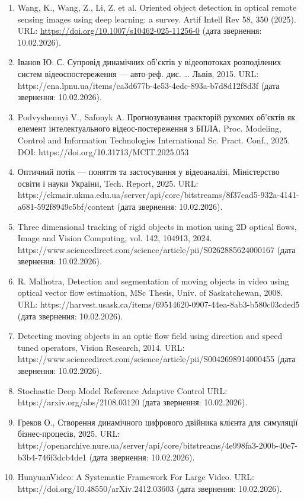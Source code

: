 \documentclass[
]{article}
\begin{document}
\begin{enumerate}
\item
  Wang, K., Wang, Z., Li, Z. et al. Oriented object detection in optical remote sensing images using deep learning: a survey. Artif Intell Rev 58, 350 (2025). URL: \url{https://doi.org/10.1007/s10462-025-11256-0} (дата звернення: 10.02.2026).
\item
  Іванов Ю. С. Супровід динамічних об'єктів у відеопотоках розподілених систем відеоспостереження --- авто-реф. дис. \ldots{} Львів, 2015. URL: https://ena.lpnu.ua/items/ca3d677b-4e53-4edc-893a-b7d8d12f8d3f (дата звернення: 10.02.2026).
\item
  Podvyshennyi V., Safonyk A. Прогнозування траєкторій рухомих об'єктів як елемент інтелектуального відеос-постереження з БПЛА. Proc. Modeling, Control and Information Technologies International Sc. Pract. Conf., 2025. DOI: https://doi.org/10.31713/MCIT.2025.053
\item
  Оптичний потік --- поняття та застосування у відеоаналізі, Міністерство освіти і науки України, Tech. Report, 2025. URL: https://ekmair.ukma.edu.ua/server/api/core/bitstreams/8f37cad5-932a-4141-a681-592f8949c5bf/content (дата звернення: 10.02.2026).
\item
  Three dimensional tracking of rigid objects in motion using 2D optical flows, Image and Vision Computing, vol. 142, 104913, 2024. https://www.sciencedirect.com/science/article/pii/S0262885624000167 (дата звернення: 10.02.2026).
\item
  R. Malhotra, Detection and segmentation of moving objects in video using optical vector flow estimation, MSc Thesis, Univ. of Saskatchewan, 2008. URL: https://harvest.usask.ca/items/69514620-0907-44ea-8ab3-b580c03cded5 (дата звернення: 10.02.2026).
\item
  Detecting moving objects in an optic flow field using direction and speed tuned operators, Vision Research, 2014. URL: https://www.sciencedirect.com/science/article/pii/S0042698914000455 (дата звернення: 10.02.2026).
\item
  Stochastic Deep Model Reference Adaptive Control URL: https://arxiv.org/abs/2108.03120 (дата звернення: 10.02.2026).
\item
  Греков О., Створення динамічного цифрового двійника клієнта для симуляції бізнес-процесів, 2025. URL: https://openarchive.nure.ua/server/api/core/bitstreams/4e998fa3-200b-40e7-b3b4-746f3dcb4de1 (дата звернення: 10.02.2026).
\item
  \protect{}\label{_Ref221609062}{}HunyuanVideo: A Systematic Framework For Large Video. URL: https://doi.org/10.48550/arXiv.2412.03603 (дата звернення: 10.02.2026).

\end{enumerate}
\end{document}
